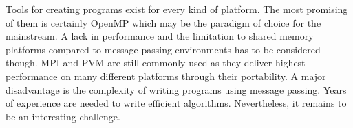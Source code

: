 Tools for creating programs exist for every kind of platform. The most
promising of them is certainly OpenMP which may be the paradigm of
choice for the mainstream. A lack in performance and the limitation to
shared memory platforms compared to message
passing environments has to be considered though. MPI and PVM are
still commonly used as they deliver highest performance on many
different platforms through their portability. A major disadvantage is
the complexity of writing programs using message passing. Years of
experience are needed to write efficient algorithms. Nevertheless, it
remains to be an interesting challenge.
